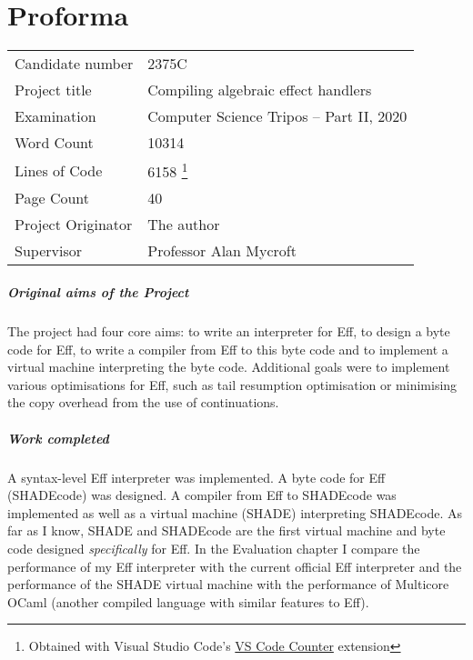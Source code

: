 \documentclass[%
    12pt,
    bibliography=toc,
    listof=leveldown,%
    oneside
]{book}
\begin{document}
\chapter{Proforma}
\begin{tabularx}{\textwidth}{@{} ll @{}}
Candidate number & 2375C \\
Project title & Compiling algebraic effect handlers \\
Examination & Computer Science Tripos -- Part II, 2020 \\
Word Count & 10314 \\
Lines of Code & 6158
\footnote{Obtained with Visual Studio Code's \href{https://marketplace.visualstudio.com/items?itemName=uctakeoff.vscode-counter}{VS Code Counter} extension} \\
Page Count & 40 \\
Project Originator & The author \\
Supervisor & Professor Alan Mycroft \\
\end{tabularx}

\paragraph{Original aims of the Project}

The project had four core aims: to write an interpreter for Eff, to design a
byte code for Eff, to write a compiler from Eff to this byte code and to
implement a virtual machine interpreting the byte code. Additional goals were
to implement various optimisations for Eff, such as tail resumption optimisation
or minimising the copy overhead from the use of continuations.

\paragraph{Work completed}

A syntax-level Eff interpreter was implemented. A byte code for Eff (SHADEcode)
was designed. A compiler from Eff to SHADEcode was implemented as well as a
virtual machine (SHADE) interpreting SHADEcode. As far as I know, SHADE and
SHADEcode are the first virtual machine and byte code designed
\emph{specifically} for Eff. In the Evaluation chapter I compare the performance
of my Eff interpreter with the current official Eff interpreter and the
performance of the SHADE virtual machine with the performance of Multicore
OCaml (another compiled language with similar features to Eff).
\end{document}

